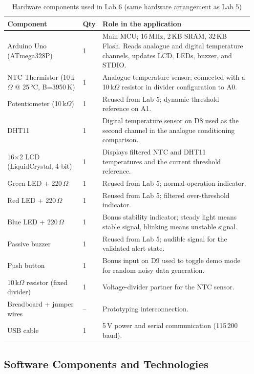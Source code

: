 \documentclass[12pt]{article}
\begin{document}
\begin{table}[H]
\centering
\begin{tabular}{p{4.2cm} p{1.8cm} p{7cm}}
\toprule
\textbf{Component} & \textbf{Qty} & \textbf{Role in the application} \\
\midrule
Arduino Uno (ATmega328P) & 1 & Main MCU; 16\,MHz, 2\,KB SRAM, 32\,KB Flash. Reads analogue and digital temperature channels, updates LCD, LEDs, buzzer, and STDIO. \\
NTC Thermistor (10\,k$\Omega$ @ 25\,°C, B=3950\,K) & 1 & Analogue temperature sensor; connected with a 10\,k$\Omega$ resistor in divider configuration to A0. \\
Potentiometer (10\,k$\Omega$) & 1 & Reused from Lab 5; dynamic threshold reference on A1. \\
DHT11 & 1 & Digital temperature sensor on D8 used as the second channel in the analogue conditioning comparison. \\
16$\times$2 LCD (LiquidCrystal, 4-bit) & 1 & Displays filtered NTC and DHT11 temperatures and the current threshold reference. \\
Green LED + 220\,$\Omega$ & 1 & Reused from Lab 5; normal-operation indicator. \\
Red LED + 220\,$\Omega$ & 1 & Reused from Lab 5; filtered over-threshold indicator. \\
Blue LED + 220\,$\Omega$ & 1 & Bonus stability indicator; steady light means stable signal, blinking means unstable signal. \\
Passive buzzer & 1 & Reused from Lab 5; audible signal for the validated alert state. \\
Push button & 1 & Bonus input on D9 used to toggle demo mode for random noisy data generation. \\
10\,k$\Omega$ resistor (fixed divider) & 1 & Voltage-divider partner for the NTC sensor. \\
Breadboard + jumper wires & -- & Prototyping interconnection. \\
USB cable & 1 & 5\,V power and serial communication (115\,200 baud). \\
\bottomrule
\end{tabular}
\caption{Hardware components used in Lab 6 (same hardware arrangement as Lab 5)}
\label{tab:hardware}
\end{table}

\subsection{Software Components and Technologies}
\end{document}
